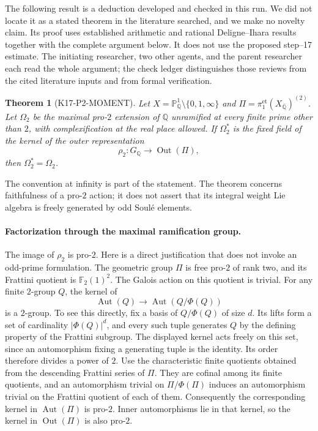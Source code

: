 \documentclass[11pt,a4paper]{article}
\newtheorem{theorem}{Theorem}[section]
\theoremstyle{definition}
\begin{document}
The following result is a deduction developed and checked in this run. We did not locate it as a stated theorem in the literature searched, and we make no novelty claim. Its proof uses established arithmetic and rational Deligne--Ihara results together with the complete argument below. It does not use the proposed step--17 estimate. The initiating researcher, two other agents, and the parent researcher each read the whole argument; the check ledger distinguishes those reviews from the cited literature inputs and from formal verification.

\begin{theorem}[K17-P2-MOMENT]\label{thm:pro2-kernel}
Let $X=\mathbb P^1_{\mathbb Q}\setminus\{0,1,\infty\}$ and $\Pi=\pi_1^{\mathrm{et}}(X_{\overline{\mathbb Q}})^{(2)}$. Let $\Omega_2$ be the maximal pro-$2$ extension of $\mathbb Q$ unramified at every finite prime other than $2$, with complexification at the real place allowed. If $\Omega_2^*$ is the fixed field of the kernel of the outer representation
\[
 \rho_2:G_{\mathbb Q}\longrightarrow\operatorname{Out}(\Pi),
\]
then $\Omega_2^*=\Omega_2$.
\end{theorem}

The convention at infinity is part of the statement. The theorem concerns faithfulness of a pro-$2$ action; it does not assert that its integral weight Lie algebra is freely generated by odd Soul\'e elements.

\paragraph{Factorization through the maximal ramification group.}
The image of $\rho_2$ is pro-$2$. Here is a direct justification that does not invoke an odd-prime formulation. The geometric group $\Pi$ is free pro-$2$ of rank two, and its Frattini quotient is $\mathbb F_2(1)^2$. The Galois action on this quotient is trivial. For any finite $2$-group $Q$, the kernel of
\[
 \operatorname{Aut}(Q)\longrightarrow
 \operatorname{Aut}(Q/\Phi(Q))
\]
is a $2$-group. To see this directly, fix a basis of $Q/\Phi(Q)$ of size $d$. Its lifts form a set of cardinality $|\Phi(Q)|^d$, and every such tuple generates $Q$ by the defining property of the Frattini subgroup. The displayed kernel acts freely on this set, since an automorphism fixing a generating tuple is the identity. Its order therefore divides a power of $2$. Use the characteristic finite quotients obtained from the descending Frattini series of $\Pi$. They are cofinal among its finite quotients, and an automorphism trivial on $\Pi/\Phi(\Pi)$ induces an automorphism trivial on the Frattini quotient of each of them. Consequently the corresponding kernel in $\operatorname{Aut}(\Pi)$ is pro-$2$. Inner automorphisms lie in that kernel, so the kernel in $\operatorname{Out}(\Pi)$ is also pro-$2$.
\end{document}
